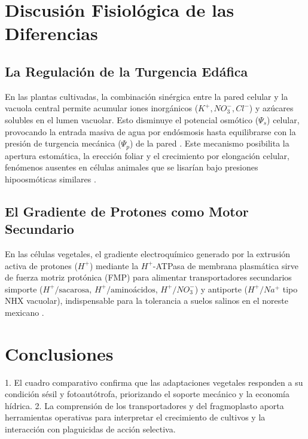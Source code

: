 \documentclass[12pt,spanish,letterpaper,oneside]{article}
\begin{document}
\section{Discusión Fisiológica de las Diferencias}
\subsection{La Regulación de la Turgencia Edáfica}
En las plantas cultivadas, la combinación sinérgica entre la pared celular y la vacuola central permite acumular iones inorgánicos ($K^+, NO_3^-, Cl^-$) y azúcares solubles en el lumen vacuolar. Esto disminuye el potencial osmótico ($\Psi_s$) celular, provocando la entrada masiva de agua por endósmosis hasta equilibrarse con la presión de turgencia mecánica ($\Psi_p$) de la pared \parencite{taiz2015}. Este mecanismo posibilita la apertura estomática, la erección foliar y el crecimiento por elongación celular, fenómenos ausentes en células animales que se lisarían bajo presiones hipoosmóticas similares \parencite{karp2014}.

\subsection{El Gradiente de Protones como Motor Secundario}
En las células vegetales, el gradiente electroquímico generado por la extrusión activa de protones ($H^+$) mediante la $H^+$-ATPasa de membrana plasmática sirve de fuerza motriz protónica (FMP) para alimentar transportadores secundarios simporte ($H^+/\text{sacarosa}$, $H^+/\text{aminoácidos}$, $H^+/NO_3^-$) y antiporte ($H^+/Na^+$ tipo NHX vacuolar), indispensable para la tolerancia a suelos salinos en el noreste mexicano \parencite{alberts2015}.

\section{Conclusiones}
1. El cuadro comparativo confirma que las adaptaciones vegetales responden a su condición sésil y fotoautótrofa, priorizando el soporte mecánico y la economía hídrica.
2. La comprensión de los transportadores y del fragmoplasto aporta herramientas operativas para interpretar el crecimiento de cultivos y la interacción con plaguicidas de acción selectiva.

\newpage
\printbibliography[title={Referencias bibliográficas}]
\end{document}
